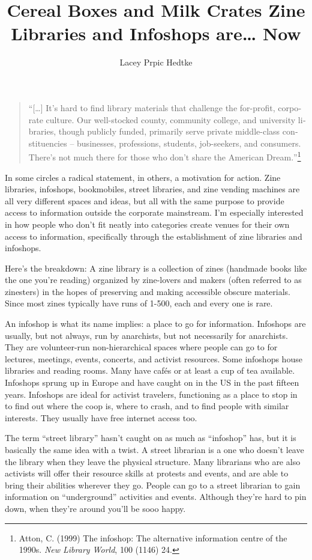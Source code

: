 \documentclass[output=paper]{langscibook}
\title{Cereal Boxes and Milk Crates Zine Libraries and Infoshops are… Now
}
\author{Lacey Prpic Hedtke}
\begin{document}
\maketitle

\begin{quote}
\foreignquote{english}{{[}\ldots{]} It's hard to find library materials that challenge
the for-profit, corporate culture. Our well-stocked county, community
college, and university libraries, though publicly funded, primarily
serve private middle-class constituencies -- businesses, professions,
students, job-seekers, and consumers. There's not much there for those
who don't share the American Dream.}\footnote{Atton, C. (1999) The
  infoshop: The alternative information centre of the 1990s. \emph{New
  Library World}, 100 (1146) 24.}
\end{quote}

In some circles a radical statement, in others, a motivation for action.
Zine libraries, infoshops, bookmobiles, street libraries, and zine
vending machines are all very different spaces and ideas, but all with
the same purpose to provide access to information outside the corporate
mainstream. I'm especially interested in how people who don't fit neatly
into categories create venues for their own access to information,
specifically through the establishment of zine libraries and infoshops.

Here's the breakdown: A zine library is a collection of zines (handmade
books like the one you're reading) organized by zine-lovers and makers
(often referred to as zinesters) in the hopes of preserving and making
accessible obscure materials. Since most zines typically have runs of
1-500, each and every one is rare.

An infoshop is what its name implies: a place to go for information.
Infoshops are usually, but not always, run by anarchists, but not
necessarily for anarchists. They are volunteer-run non-hierarchical
spaces where people can go to for lectures, meetings, events, concerts,
and activist resources. Some infoshops house libraries and reading
rooms. Many have cafés or at least a cup of tea available. Infoshops
sprung up in Europe and have caught on in the US in the past fifteen
years. Infoshops are ideal for activist travelers, functioning as a
place to stop in to find out where the coop is, where to crash, and to
find people with similar interests. They usually have free internet
access too.

The term \foreignquote{english}{street library} hasn't caught on as much as
\foreignquote{english}{infoshop} has, but it is basically the same idea with a twist.
A street librarian is a one who doesn't leave the library when they
leave the physical structure. Many librarians who are also activists
will offer their resource skills at protests and events, and are able to
bring their abilities wherever they go. People can go to a street
librarian to gain information on \foreignquote{english}{underground} activities and
events. Although they're hard to pin down, when they're around you'll be
sooo happy.
\end{document}
